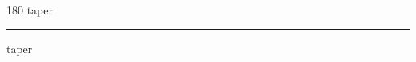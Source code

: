 
\begin{frame}
\begin{center}
\begin{turn}{180}
{\fontsize{2.5cm}{1em}\selectfont taper}
\end{turn}
\vspace{1em}\par  
\hrule
\vspace{1em}\par  
{\fontsize{2.5cm}{1em}\selectfont taper}
\end{center}
\end{frame}
